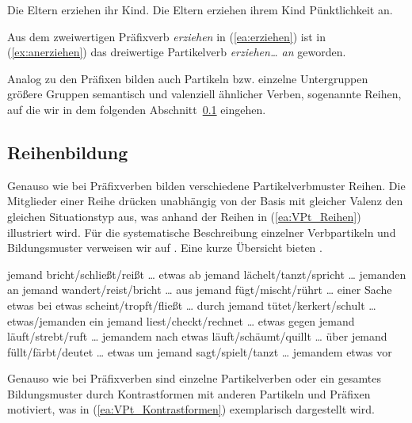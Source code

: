 \ea \label{ea:an_erziehen}
\ea \label{ea:erziehen} Die Eltern erziehen ihr Kind.
\ex \label{ex:anerziehen} Die Eltern erziehen ihrem Kind Pünktlichkeit an.
\z 
\z 

Aus dem zweiwertigen Präfixverb \textit{erziehen} in (\ref{ea:erziehen}) ist in (\ref{ex:anerziehen}) das dreiwertige Partikelverb \textit{erziehen\ldots{} an} geworden.

Analog zu den Präfixen bilden auch Partikeln bzw. einzelne Untergruppen größere Gruppen semantisch und valenziell ähnlicher Verben, sogenannte Reihen, auf die wir in dem folgenden Abschnitt~\ref{subsection:Vpt_Reihenbildung} eingehen. 


\subsection{Reihenbildung}\label{subsection:Vpt_Reihenbildung}
\largerpage

Genauso wie bei Präfixverben bilden verschiedene Partikelverbmuster Reihen. Die Mitglieder einer Reihe drücken unabhängig von der Basis mit gleicher Valenz den gleichen Situationstyp aus, was anhand der Reihen in (\ref{ea:VPt_Reihen}) illustriert wird. Für die systematische Beschreibung einzelner Verbpartikeln und Bildungsmuster verweisen wir auf \citet[141--375]{Kuehnhold1973}. Eine kurze Übersicht bieten \citet[399--418]{FleischerBarz2012}.


\ea \label{ea:VPt_Reihen}
\ea \label{ea:ab_Reihe} jemand bricht/schließt/reißt \ldots{} etwas ab 
\ex \label{ex:an_Reihe} jemand lächelt/tanzt/spricht \ldots{} jemanden an
\ex \label{ex:aus_Reihe} jemand wandert/reist/bricht \ldots{} aus
\ex \label{ex:bei_Reihe} jemand fügt/mischt/rührt \ldots{} einer Sache etwas bei
\ex \label{ex:durch} etwas scheint/tropft/fließt \ldots{} durch
\ex \label{ex:ein_Reihe} jemand tütet/kerkert/schult \ldots{} etwas/jemanden ein
\ex \label{ex:gegen_Reihe} jemand liest/checkt/rechnet \ldots{} etwas gegen
\ex \label{ex:nach_Reihe} jemand läuft/strebt/ruft \ldots{} jemandem nach
\ex \label{ex:über_Reihe} etwas läuft/schäumt/quillt \ldots{} über
\ex \label{ex:um_Reihe} jemand füllt/färbt/deutet \ldots{} etwas um
\ex \label{ex:vor_Reihe} jemand sagt/spielt/tanzt \ldots{} jemandem etwas vor
\z 
\z 

Genauso wie bei Präfixverben sind einzelne Partikelverben oder ein gesamtes Bildungsmuster durch Kontrastformen mit anderen Partikeln und Präfixen motiviert, was in (\ref{ea:VPt_Kontrastformen}) exemplarisch dargestellt wird.

